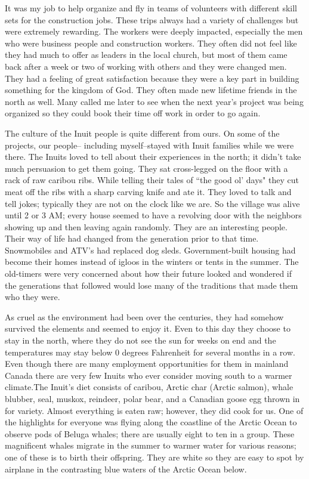 \documentclass[oneside]{book}
\begin{document}
It was my job to help organize and fly in teams of volunteers with different skill sets for the construction jobs. These trips always had a variety of challenges but were extremely rewarding. The workers were deeply impacted, especially the men who were business people and construction workers. They often did not feel like they had much to offer as leaders in the local church, but most of them came back after a week or two of working with others and they were changed men. They had a feeling of great satisfaction because they were a key part in building something for the kingdom of God. They often made new lifetime friends in the north as well. Many called me later to see when the next year's project was being organized so they could book their time off work in order to go again.

The culture of the Inuit people is quite different from ours. On some of the projects, our people-- including myself--stayed with Inuit families while we were there. The Inuits loved to tell about their experiences in the north; it didn't take much persuasion to get them going. They sat cross-legged on the floor with a rack of raw caribou ribs. While telling their tales of ``the good ol' days" they cut meat off the ribs with a sharp carving knife and ate it. They loved to talk and tell jokes; typically they are not on the clock like we are. So the village was alive until 2 or 3 AM; every house seemed to have a revolving door with the neighbors showing up and then leaving again randomly. They are an interesting people. Their way of life had changed from the generation prior to that time. Snowmobiles and ATV's had replaced dog sleds. Government-built housing had become their homes instead of igloos in the winters or tents in the summer. The old-timers were very concerned about how their future looked and wondered if the generations that followed would lose many of the traditions that made them who they were. 

As cruel as the environment had been over the centuries, they had somehow survived the elements and seemed to enjoy it. Even to this day they choose to stay in the north, where they do not see the sun for weeks on end and the temperatures may stay below 0 degrees Fahrenheit for several months in a row. Even though there are many employment opportunities for them in mainland Canada there are very few Inuits who ever consider moving south to a warmer climate.The Inuit's diet consists of caribou, Arctic char (Arctic salmon), whale blubber, seal, muskox, reindeer, polar bear, and a Canadian goose egg thrown in for variety. Almost everything is eaten raw; however, they did cook for us. One of the highlights for everyone was flying along the coastline of the Arctic Ocean to observe pods of Beluga whales; there are usually eight to ten in a group. These magnificent whales migrate in the summer to warmer water for various reasons; one of these is to birth their offspring. They are white so they are easy to spot by airplane in the contrasting blue waters of the Arctic Ocean below.
\end{document}
